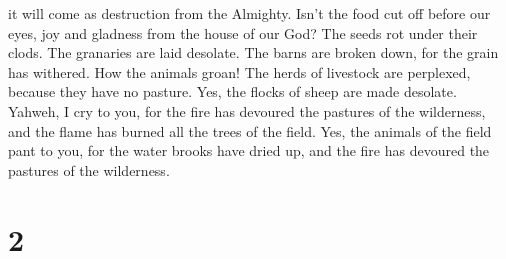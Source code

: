it will come as destruction from the Almighty.  Isn't the
food cut off before our eyes, joy and gladness from the house of our
God?  The seeds rot under their clods. The granaries are
laid desolate. The barns are broken down, for the grain has withered.
 How the animals groan! The herds of livestock are
perplexed, because they have no pasture. Yes, the flocks of sheep are
made desolate.  Yahweh, I cry to you, for the fire has
devoured the pastures of the wilderness, and the flame has burned all
the trees of the field.  Yes, the animals of the field
pant to you, for the water brooks have dried up, and the fire has
devoured the pastures of the wilderness.

\hypertarget{section-1}{%
\section{2}\label{section-1}}

